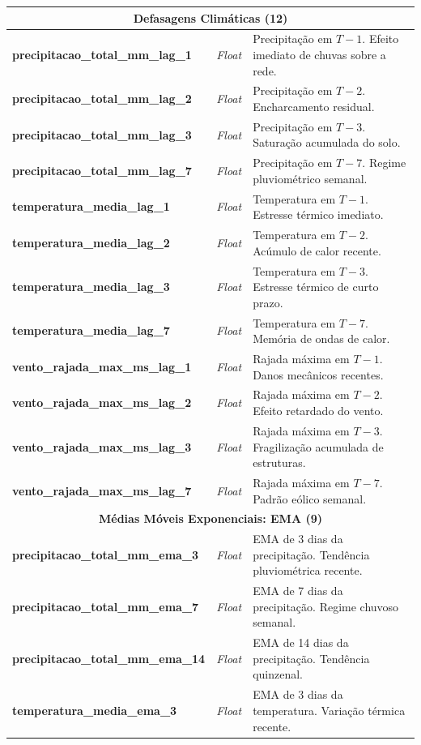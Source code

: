 \begin{center}
\begin{longtable}{p{6cm} p{1.2cm} p{5.8cm}}
\midrule
\multicolumn{3}{c}{\textbf{Defasagens Climáticas (12)}} \\
\midrule
\textbf{precipitacao\_total\_mm\_lag\_1} & \textit{Float} & Precipitação em $T-1$. Efeito imediato de chuvas sobre a rede. \\
\textbf{precipitacao\_total\_mm\_lag\_2} & \textit{Float} & Precipitação em $T-2$. Encharcamento residual. \\
\textbf{precipitacao\_total\_mm\_lag\_3} & \textit{Float} & Precipitação em $T-3$. Saturação acumulada do solo. \\
\textbf{precipitacao\_total\_mm\_lag\_7} & \textit{Float} & Precipitação em $T-7$. Regime pluviométrico semanal. \\
\textbf{temperatura\_media\_lag\_1} & \textit{Float} & Temperatura em $T-1$. Estresse térmico imediato. \\
\textbf{temperatura\_media\_lag\_2} & \textit{Float} & Temperatura em $T-2$. Acúmulo de calor recente. \\
\textbf{temperatura\_media\_lag\_3} & \textit{Float} & Temperatura em $T-3$. Estresse térmico de curto prazo. \\
\textbf{temperatura\_media\_lag\_7} & \textit{Float} & Temperatura em $T-7$. Memória de ondas de calor. \\
\textbf{vento\_rajada\_max\_ms\_lag\_1} & \textit{Float} & Rajada máxima em $T-1$. Danos mecânicos recentes. \\
\textbf{vento\_rajada\_max\_ms\_lag\_2} & \textit{Float} & Rajada máxima em $T-2$. Efeito retardado do vento. \\
\textbf{vento\_rajada\_max\_ms\_lag\_3} & \textit{Float} & Rajada máxima em $T-3$. Fragilização acumulada de estruturas. \\
\textbf{vento\_rajada\_max\_ms\_lag\_7} & \textit{Float} & Rajada máxima em $T-7$. Padrão eólico semanal. \\
\midrule
\multicolumn{3}{c}{\textbf{Médias Móveis Exponenciais: EMA (9)}} \\
\midrule
\textbf{precipitacao\_total\_mm\_ema\_3} & \textit{Float} & EMA de 3 dias da precipitação. Tendência pluviométrica recente. \\
\textbf{precipitacao\_total\_mm\_ema\_7} & \textit{Float} & EMA de 7 dias da precipitação. Regime chuvoso semanal. \\
\textbf{precipitacao\_total\_mm\_ema\_14} & \textit{Float} & EMA de 14 dias da precipitação. Tendência quinzenal. \\
\textbf{temperatura\_media\_ema\_3} & \textit{Float} & EMA de 3 dias da temperatura. Variação térmica recente. \\

\end{longtable}
\end{center}
